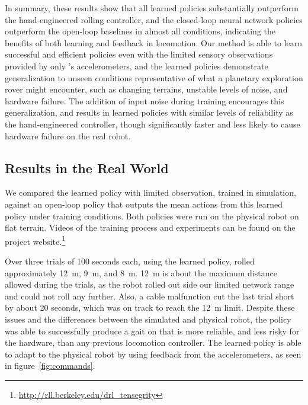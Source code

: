 In summary, these results show that all learned policies substantially
outperform the hand-engineered rolling controller, and the closed-loop neural
network policies outperform the open-loop baselines in almost all conditions,
indicating the benefits of both learning and feedback in \SB{} locomotion. Our
method is able to learn successful and efficient policies even with the limited
sensory observations provided by only \SB{}'s accelerometers, and the learned
policies demonstrate generalization to unseen conditions representative of what
a planetary exploration rover might encounter, such as changing terrains,
unstable levels of noise, and hardware failure. The addition of input noise
during training encourages this generalization, and results in learned policies
with similar levels of reliability as the hand-engineered controller, though
significantly faster and less likely to cause hardware failure on the real
robot.

\subsection{Results in the Real World}
\label{sec:realresults}

We compared the learned policy with limited observation, trained in simulation,
against an open-loop policy that outputs the mean actions from this learned
policy under training conditions. Both policies were run on the physical \SB{}
robot on flat terrain. Videos of the training process and experiments can be
found on the project
website.\footnote{\url{http://rll.berkeley.edu/drl\_tensegrity}}

Over three trials of 100 seconds each, using the learned policy, \SB{} rolled
approximately \SI{12}{\meter}, \SI{9}{\meter}, and \SI{8}{\meter}.
\SI{12}{\meter} is about the maximum distance allowed during the trials, as the robot rolled 
out side our limited network range and could not roll any further.
Also, a cable malfunction cut the last
trial short by about 20 seconds, which was on track to reach the \SI{12}{\meter} limit. 
Despite these issues and the differences
between the simulated and physical robot, the policy was able to successfully
produce a gait on \SB{} that is more reliable, and less risky for
the hardware, than any previous locomotion controller.
The learned policy is able to adapt to the
physical \SB{} robot by using feedback from the accelerometers, as seen in 
figure~\ref{fig:commands}.

